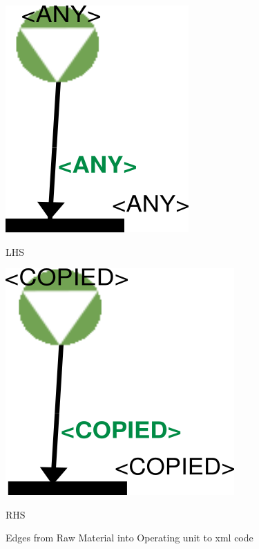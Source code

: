 \begin{figure}[th]
\centering
\begin{minipage}{.6\textwidth}
 
  \includegraphics[width=.7\linewidth]{Chapiter3/img/xL2}
  \linebreak

\hspace{2.5cm}  LHS
 
  
\end{minipage}%
\begin{minipage}{.6\textwidth}
 
  \includegraphics[width=.7\linewidth]{Chapiter3/img/xR2}
\linebreak  

\hspace{2.5cm}  RHS 
 
\end{minipage}
\caption{\label{fig:edgotoraw}Edges from Raw Material into Operating unit to xml code} 

\end{figure} 
 
